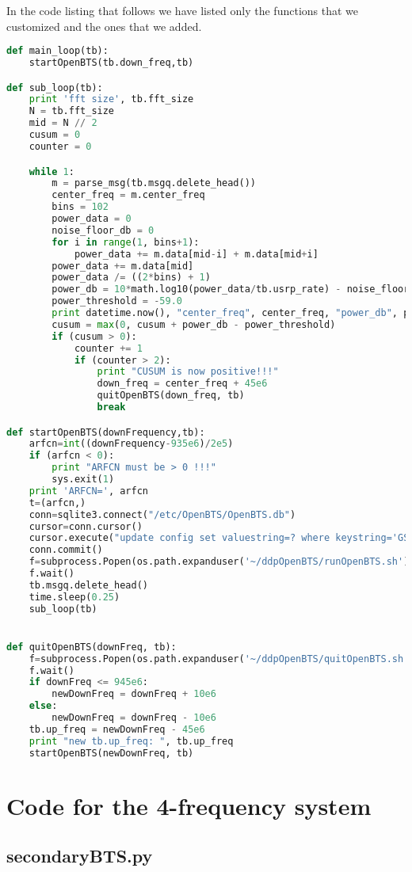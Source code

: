 In the code listing that follows we have listed only the functions that we
customized and the ones that we added.

\begin{lstlisting}[language=Python]
def main_loop(tb):
    startOpenBTS(tb.down_freq,tb)

def sub_loop(tb):
    print 'fft size', tb.fft_size
    N = tb.fft_size
    mid = N // 2
    cusum = 0
    counter = 0

    while 1:
        m = parse_msg(tb.msgq.delete_head())
        center_freq = m.center_freq
        bins = 102
        power_data = 0
        noise_floor_db = 0 
        for i in range(1, bins+1):
            power_data += m.data[mid-i] + m.data[mid+i]
        power_data += m.data[mid]
        power_data /= ((2*bins) + 1)
        power_db = 10*math.log10(power_data/tb.usrp_rate) - noise_floor_db
        power_threshold = -59.0
        print datetime.now(), "center_freq", center_freq, "power_db", power_db
        cusum = max(0, cusum + power_db - power_threshold)
        if (cusum > 0):
            counter += 1
            if (counter > 2):
                print "CUSUM is now positive!!!"
                down_freq = center_freq + 45e6
                quitOpenBTS(down_freq, tb)
                break

def startOpenBTS(downFrequency,tb):
    arfcn=int((downFrequency-935e6)/2e5)
    if (arfcn < 0):
        print "ARFCN must be > 0 !!!"
        sys.exit(1)
    print 'ARFCN=', arfcn
    t=(arfcn,)
    conn=sqlite3.connect("/etc/OpenBTS/OpenBTS.db")
    cursor=conn.cursor()
    cursor.execute("update config set valuestring=? where keystring='GSM.Radio.C0'",t)
    conn.commit()
    f=subprocess.Popen(os.path.expanduser('~/ddpOpenBTS/runOpenBTS.sh'))
    f.wait()
    tb.msgq.delete_head()
    time.sleep(0.25)
    sub_loop(tb)


def quitOpenBTS(downFreq, tb):
    f=subprocess.Popen(os.path.expanduser('~/ddpOpenBTS/quitOpenBTS.sh'))
    f.wait()
    if downFreq <= 945e6:
        newDownFreq = downFreq + 10e6
    else:
        newDownFreq = downFreq - 10e6
    tb.up_freq = newDownFreq - 45e6
    print "new tb.up_freq: ", tb.up_freq
    startOpenBTS(newDownFreq, tb)
\end{lstlisting}


\section{Code for the 4-frequency system}
\subsection{secondaryBTS.py}

